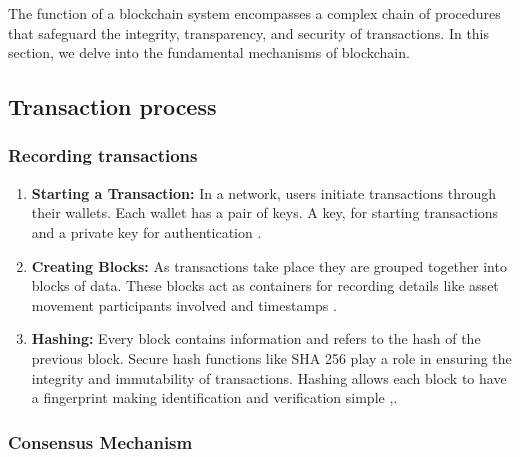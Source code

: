 The function of a blockchain system encompasses a complex chain of procedures that safeguard the  integrity, transparency, and security of transactions. In this section, 
we delve into the fundamental mechanisms of blockchain.

\subsection{Transaction process}

\subsubsection{Recording transactions}

\begin{enumerate}
    \item \textbf{Starting a Transaction:} In a network, users initiate transactions through their wallets. Each wallet has a pair of keys. A key, for starting transactions 
    and a private key for authentication \cite{9596538}.
    \item \textbf{Creating Blocks:} As transactions take place they are grouped together into blocks of data. These blocks act as containers for recording details like 
    asset movement participants involved and timestamps \cite{ibm_blockchain}.
    \item \textbf{Hashing:} Every block contains information and refers to the hash of the previous block. Secure hash functions like SHA 256 play a role in ensuring the 
    integrity and immutability of transactions. Hashing allows each block to have a fingerprint making identification and verification simple \cite{ibm_blockchain} ,\cite{9036241}.
\end{enumerate}

\subsubsection{Consensus Mechanism}

